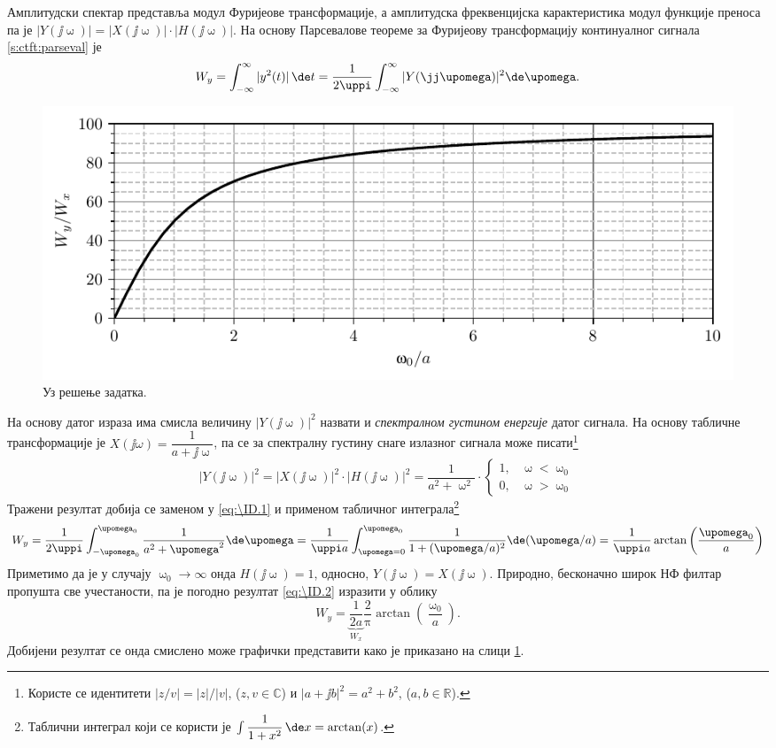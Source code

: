 Амплитудски спектар представља модул Фуријеове трансформације, а амплитудска фреквенцијска карактеристика модул функције преноса па је 
$|Y(\jj\upomega)| = |X(\jj\upomega)| \cdot |H(\jj\upomega)|$. На основу Парсевалове теореме за Фуријеову трансформацију континуалног 
сигнала \eqref{s:ctft:parseval} је 
\begin{equation}
    W_y = \int_{-\infty}^{\infty} |y^2(t)|\,\de t = 
    \dfrac{1}{2\uppi}\int_{-\infty}^{\infty} |Y(\jj\upomega)|^2 \de \upomega. \label{eq:\ID.1}
\end{equation}
%
\begin{figure}[b!]
    \centering
    \includegraphics{fig/energija_wy.pdf}
    \caption{Уз решење задатка.}
    \label{fig:\ID.2}
\end{figure}
%
На основу датог израза има смисла величину $|Y(\jj\upomega)|^2$ назвати и \textit{спектралном густином енергије} 
датог сигнала. На основу табличне трансформације  је 
$X(\jj\omega) = \dfrac{1}{a + \jj\upomega}$, па се за спектралну густину снаге излазног сигнала може писати\footnote{
    Користе се идентитети  $|z/v| = |z|/|v|$, ($z,v\in\mathbb C$) и $|a +\jj b|^2 =  a^2 + b^2$, ($a,b \in \mathbb R$).
}
\begin{equation}
    |Y(\jj\upomega)|^2 = |X(\jj\upomega)|^2 \cdot |H(\jj\upomega)|^2 
    = \dfrac{1}{a^2 + \upomega^2} \cdot \begin{cases}
        1 ,& \upomega < \upomega_0 \\
        0 ,& \upomega > \upomega_0
    \end{cases}
\end{equation} 
Тражени резултат добија се заменом у \ref{eq:\ID.1} и применом табличног интеграла\footnote{
    Таблични интеграл који се користи је 
    $
    \int \dfrac{1}{1 + x^2} \, \de x = \arctan(x)
    $.
}
\begin{equation}
    W_y = 
    \dfrac{1}{2\uppi} \int_{-\upomega_0}^{\upomega_0} \dfrac{1}{a^2 + \upomega^2}  \de \upomega
    = \dfrac{1}{\uppi a} \int_{\upomega = 0}^{\upomega_0} \dfrac{1}{1 + (\upomega/a)^2}  \de (\upomega/a)
    = \dfrac{1}{\uppi a} \arctan\left( \dfrac{\upomega_0}{a} \right) \label{eq:\ID.2}
\end{equation}
Приметимо да је у случају $\upomega_0 \to \infty$ онда $H(\jj\upomega) = 1$, односно, $Y(\jj\upomega) = X(\jj\upomega)$. Природно, 
бесконачно широк НФ филтар пропушта све учестаности, па је погодно резултат \eqref{eq:\ID.2} изразити у облику 
\begin{equation}
    W_y = \underbrace{\dfrac{1}{2a}}_{W_x} \dfrac{2}{\uppi} \arctan\left(\dfrac{\upomega_0}{a}\right).
\end{equation}
Добијени резултат се онда смислено може графички представити како је приказано на слици \ref{fig:\ID.2}.
